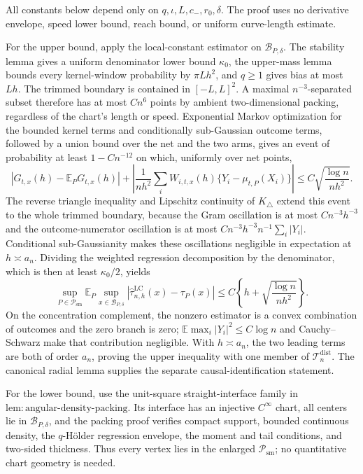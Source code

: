 All constants below depend only on \(q,\iota,L,c_-,r_0,\delta\).  The proof uses no derivative envelope, speed lower bound, reach bound, or uniform curve-length estimate.

For the upper bound, apply the local-constant estimator on \(\mathcal B_{P,\delta}\).  The stability lemma gives a uniform denominator lower bound \(\kappa_0\), the upper-mass lemma bounds every kernel-window probability by \(\pi Lh^2\), and \(q\geq1\) gives bias at most \(Lh\).  The trimmed boundary is contained in \([-L,L]^2\).  A maximal \(n^{-3}\)-separated subset therefore has at most \(Cn^6\) points by ambient two-dimensional packing, regardless of the chart's length or speed.  Exponential Markov optimization for the bounded kernel terms and conditionally sub-Gaussian outcome terms, followed by a union bound over the net and the two arms, gives an event of probability at least \(1-Cn^{-12}\) on which, uniformly over net points,
\[
\left|G_{t,x}(h)-\mathbb E_PG_{t,x}(h)\right|
+\left|\frac1{nh^2}\sum_iW_{i,t,x}(h)\{Y_i-\mu_{t,P}(X_i)\}\right|
\leq C\sqrt{\frac{\log n}{nh^2}}.
\]
The reverse triangle inequality and Lipschitz continuity of \(K_\triangle\) extend this event to the whole trimmed boundary, because the Gram oscillation is at most \(Cn^{-3}h^{-3}\) and the outcome-numerator oscillation is at most \(Cn^{-3}h^{-3}n^{-1}\sum_i|Y_i|\).  Conditional sub-Gaussianity makes these oscillations negligible in expectation at \(h\asymp a_n\).  Dividing the weighted regression decomposition by the denominator, which is then at least \(\kappa_0/2\), yields
\[
\sup_{P\in\mathcal P_{\mathrm{sm}}}\mathbb E_P\sup_{x\in\mathcal B_{P,\delta}}
|\widehat\tau^{\mathrm{LC}}_{n,h}(x)-\tau_P(x)|
\leq C\left\{h+\sqrt{\frac{\log n}{nh^2}}\right\}.
\]
On the concentration complement, the nonzero estimator is a convex combination of outcomes and the zero branch is zero; \(\mathbb E\max_i|Y_i|^2\leq C\log n\) and Cauchy--Schwarz make that contribution negligible.  With \(h\asymp a_n\), the two leading terms are both of order \(a_n\), proving the upper inequality with one member of \(\mathcal T_n^{\mathrm{dist}}\).  The canonical radial lemma supplies the separate causal-identification statement.

For the lower bound, use the unit-square straight-interface family in \(\mathrm{lem:angular\text{-}density\text{-}packing}\).  Its interface has an injective \(C^\infty\) chart, all centers lie in \(\mathcal B_{P,\delta}\), and the packing proof verifies compact support, bounded continuous density, the \(q\)-H\"older regression envelope, the moment and tail conditions, and two-sided thickness.  Thus every vertex lies in the enlarged \(\mathcal P_{\mathrm{sm}}\); no quantitative chart geometry is needed.

